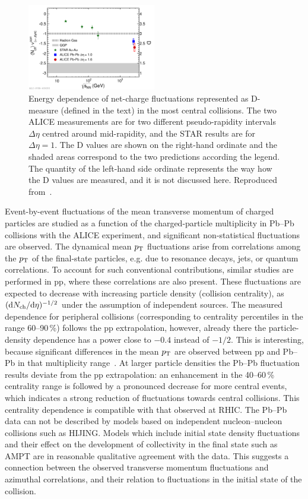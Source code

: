 \begin{figure}
\centering
\includegraphics[width=0.5\textwidth]{ksfigures/NetChargeFluct.pdf}
\caption{Energy dependence of net-charge fluctuations represented as D-measure (defined in the text) in the most central collisions. The two ALICE measurements are for two different pseudo-rapidity intervals $\Delta\eta$ centred around mid-rapidity, and the STAR results are for $\Delta\eta = 1$. The D values are shown on the right-hand ordinate and the shaded areas correspond to the two predictions according the legend. The quantity of the left-hand side ordinate represents the way how the D values are measured, and it is not discussed here. Reproduced from~\cite{}.}
\label{figks:ChargeFluct}
\end{figure}

Event-by-event fluctuations of the mean transverse momentum of charged particles are studied as a function of the charged-particle multiplicity in Pb--Pb collisions with the ALICE experiment, and significant non-statistical fluctuations are observed. The dynamical mean $p_{\rm T}$ fluctuations arise from correlations among the $p_{\rm T}$ of the final-state particles, e.g. due to resonance decays, jets, or quantum correlations. To account for such conventional contributions, similar studies are performed in pp, where these correlations are also present.  These fluctuations are expected to decrease with increasing particle density (collision centrality), as $({\rm d}N_{\rm ch}/{\rm d}\eta)^{-1/2}$ under the assumption of independent sources. The measured dependence for peripheral collisions (corresponding to centrality percentiles in the range 60--90\,\%) follows the pp extrapolation, however, already there the particle-density dependence has a power close to $-0.4$ instead of $-1/2$. This is interesting, because significant differences in the mean $p_{\rm T}$ are observed between pp and Pb--Pb in that multiplicity range~\cite{}. At larger particle densities the Pb--Pb fluctuation results deviate from the pp extrapolation: an enhancement in the 40--60\,\% centrality range is followed by a pronounced decrease for more central events, which indicates a strong reduction of fluctuations towards central collisions. This centrality dependence is compatible with that observed at RHIC. The Pb--Pb data can not be described by models based on independent nucleon--nucleon collisions such as HIJING. Models which include initial state density fluctuations and their effect on the development of collectivity in the final state such as AMPT are in reasonable qualitative agreement with the data. This suggests a connection between the observed transverse momentum fluctuations and azimuthal correlations, and their relation to fluctuations in the initial state of the collision.

